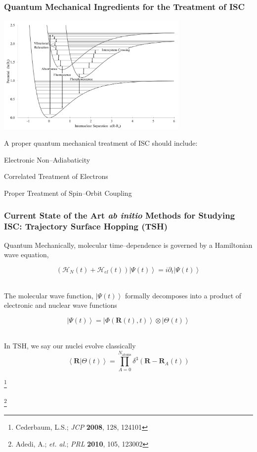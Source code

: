 \documentclass[usepdftitle=false,10pt]{beamer}
\newcommand{\bpar}[1]{\left( #1 \right)}                  %
\newcommand{\ket}[1]{\left\vert #1 \right\rangle}         %
\newcommand{\inner}[2]{\left\langle #1 \left\vert\right. #2 \right\rangle}            %
\newcommand*\vc[1]{\boldsymbol{#1}}
\newcommand*\op[1]{\mathcal{#1}}
\newcommand\blfootnote[1]{%
  \begingroup
  \renewcommand\thefootnote{}\footnote{#1}%
  \addtocounter{footnote}{-1}%
  \endgroup
}
\begin{document}
\begin{frame}
  \frametitle{Quantum Mechanical Ingredients for the Treatment of ISC}
  \begin{center}
  \includegraphics[width=0.7\textwidth]{ISC} 
  \end{center}
  \vspace{-0.5cm}
  A proper quantum mechanical treatment of ISC should include:\\
  \begin{mylist}
    \item Electronic Non--Adiabaticity
    \item Correlated Treatment of Electrons
    \item Proper Treatment of Spin--Orbit Coupling
  \end{mylist}
\end{frame}

\begin{frame}
  \frametitle{Current State of the Art \emph{ab initio} Methods for Studying 
  ISC: Trajectory Surface Hopping (TSH)}

  Quantum Mechanically, molecular time--dependence is governed by a Hamiltonian
  wave equation,

  \begin{equation*}
    \bpar{\op{H}_N(t) + \op{H}_{el}(t)} \ket{\Psi (t)} = i\partial_t \ket{\Psi(t)}
  \end{equation*}

  ~\\
  The molecular wave function, $\ket{\Psi(t)}$ formally decomposes into a product
  of electronic and nuclear wave functions

  \begin{equation*} 
    \ket{\Psi (t)} = \ket{\Phi(\vc{R}(t),t)}\otimes\ket{\Theta(t)} 
  \end{equation*} 

  ~\\
  In TSH, we say our nuclei evolve classically
  \begin{equation*}
    \inner{\vc{R}}{\Theta (t)} = \prod_{A = 0}^{N_\mathrm{atoms}} 
    \delta^3(\vc{R} - \vc{R}_A(t))
  \end{equation*}

  \vspace{-0.5cm}
  \blfootnote{\tiny Cederbaum, L.S.; \emph{JCP} \textbf{2008}, 128, 124101}
  \blfootnote{\tiny Adedi, A.; \emph{et. al.}; \emph{PRL} \textbf{2010}, 105, 123002}
\end{frame}
\end{document}
